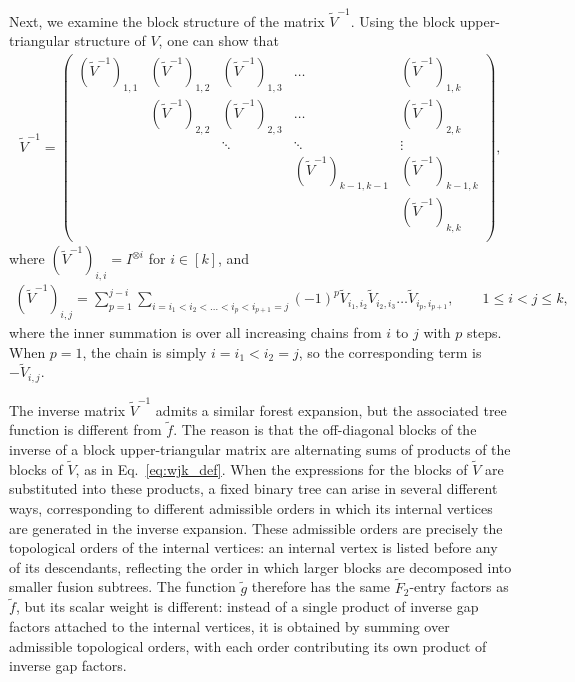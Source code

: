 \documentclass[superscriptaddress,onecolumn,nofootinbib,longbibliography,a4paper,accepted=2026-09-29]{quantumarticle}
\theoremstyle{plain}
\theoremstyle{definition}
\numberwithin{thm}{section}
\numberwithin{assumption}{section}
\numberwithin{lemma}{section}
\numberwithin{prop}{section}
\numberwithin{cor}{section}
\numberwithin{definition}{section}
\numberwithin{rmk}{section}
\numberwithin{equation}{section}
\begin{document}
Next, we examine the block structure of the matrix $\tilde{V}^{-1}$. Using the block upper-triangular structure of $V$, one can show that
\begin{align}
    \tilde{V}^{-1} = \begin{pmatrix}
        (\tilde{V}^{-1})_{1,1}  & (\tilde{V}^{-1})_{1,2}   &  (\tilde{V}^{-1})_{1,3} & \dots  & (\tilde{V}^{-1})_{1,k} \\
                 & (\tilde{V}^{-1})_{2,2}   &  (\tilde{V}^{-1})_{2,3} & \dots & (\tilde{V}^{-1})_{2,k} \\
                 &           & \ddots &   \ddots       & \vdots \\
                 &           &          & (\tilde{V}^{-1})_{k-1,k-1} & (\tilde{V}^{-1})_{k-1, k} \\
                &           &          &  & (\tilde{V}^{-1})_{k,k} \\\end{pmatrix},
\end{align}
where $(\tilde{V}^{-1})_{i,i}=I^{\otimes i}$ for $i \in [k]$, and 
\begin{align}
(\tilde{V}^{-1})_{i,j} = \sum_{p=1}^{j-i} \sum_{i=i_1<i_2<\dots<i_p<i_{p+1}=j} (-1)^p \tilde{V}_{i_1,i_2}\tilde{V}_{i_2,i_3}\dots \tilde{V}_{i_p,i_{p+1}}, \qquad 1 \le i < j \le k,
\label{eq:wjk_def}
\end{align}
where the inner summation is over all increasing chains from $i$ to $j$ with $p$ steps. When $p=1$, the chain is simply $i=i_1<i_2=j$, so the corresponding term is $-\tilde{V}_{i,j}$.


The inverse matrix $\tilde{V}^{-1}$ admits a similar forest expansion, but the associated tree function is different from $\tilde{f}$. The reason is that the off-diagonal blocks of the inverse of a block upper-triangular matrix are alternating sums of products of the blocks of $\tilde{V}$, as in Eq.~\eqref{eq:wjk_def}. When the expressions for the blocks of $\tilde{V}$ are substituted into these products, a fixed binary tree can arise in several different ways, corresponding to different admissible orders in which its internal vertices are generated in the inverse expansion. These admissible orders are precisely the topological orders of the internal vertices: an internal vertex is listed before any of its descendants, reflecting the order in which larger blocks are decomposed into smaller fusion subtrees. The function $\tilde{g}$ therefore has the same $\tilde{F}_2$-entry factors as $\tilde{f}$, but its scalar weight is different: instead of a single product of inverse gap factors attached to the internal vertices, it is obtained by summing over admissible topological orders, with each order contributing its own product of inverse gap factors.
\end{document}
